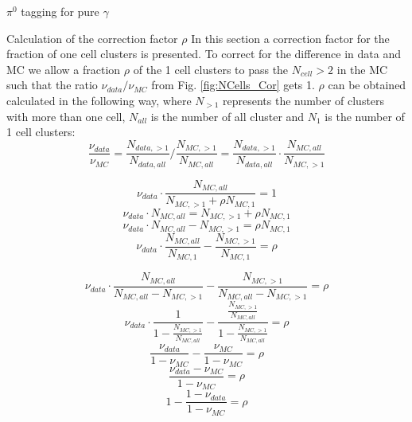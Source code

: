 \documentclass[ALICE]{ALICE_analysis_notes}
\newcommand{\PZ}{$\pi^0$\xspace}
\newcommand{\g}{$\gamma$\xspace}
\begin{document}
\begin{section}{\PZ tagging for pure \g}
\begin{section}{Calculation of the correction factor $\rho$}
	In this section a correction factor for the fraction of one cell clusters is presented.
	To correct for the difference in data and MC we allow a fraction $\rho$ of the 1 cell clusters to pass the $N_{cell} > 2$ in the MC such that the ratio  $\nu_{data}/\nu_{MC}$ from Fig. \ref{fig:NCells_Cor} gets 1. $\rho$ can be obtained calculated in the following way, where $N_{>1}$ represents the number of clusters with more than one cell,  $N_{all}$ is the number of all cluster and $N_{1}$ is the number of 1 cell clusters:
	\begin{equation}
	\frac{\nu_{data}}{\nu_{MC}} = \frac{N_{data, >1}}{N_{data, all}} / \frac{N_{MC, >1}}{N_{MC, all}}  = \frac{N_{data, >1}}{N_{data, all}} \cdot \frac{N_{MC, all}}{N_{MC, >1}}
	\end{equation} 
	
	\begin{equation}
	\nu_{data} \cdot \frac{N_{MC, all}}{N_{MC, >1} + \rho N_{MC, 1}} = 1
	\end{equation} 
	\begin{equation}
	\nu_{data} \cdot N_{MC, all} = N_{MC, >1} + \rho N_{MC, 1}
	\end{equation} 
	\begin{equation}
	\nu_{data} \cdot N_{MC, all} - N_{MC, >1} =  \rho N_{MC, 1}
	\end{equation} 
	\begin{equation}
	\nu_{data} \cdot \frac{N_{MC, all}}{N_{MC, 1}} - \frac{N_{MC, >1}}{N_{MC, 1}} =  \rho 
	\end{equation} 
	
	\begin{equation}
	\nu_{data} \cdot \frac{N_{MC, all}}{N_{MC, all} - N_{MC, >1}} - \frac{N_{MC, >1}}{N_{MC, all} - N_{MC, >1}} =  \rho
	\end{equation}
	\begin{equation}
	\nu_{data} \cdot \frac{1}{ 1 - \frac{N_{MC, >1}}{N_{MC, all}}} - \frac{\frac{N_{MC, >1}}{N_{MC, all}}}{1 - \frac{N_{MC, >1}}{N_{MC, all}}} =  \rho
	\end{equation}
	\begin{equation}
	\frac{\nu_{data}}{1 - \nu_{MC}} - \frac{\nu_{MC}}{1 - \nu_{MC}} =  \rho
	\end{equation}
	\begin{equation}
	\frac{\nu_{data} - \nu_{MC}}{1 - \nu_{MC}} =  \rho
	\end{equation}
	\begin{equation}
	1 - \frac{ 1 - \nu_{data} }{1 - \nu_{MC}} =  \rho
	\end{equation}
	

\end{section}
\end{section}
\end{document}
